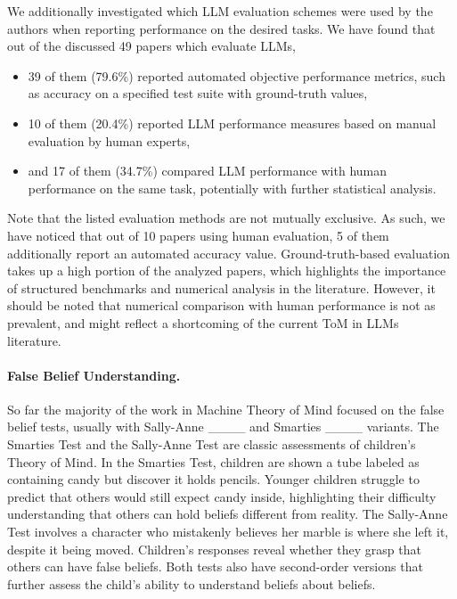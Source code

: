 We additionally investigated which LLM evaluation schemes were used by the authors when reporting performance on the desired tasks. We have found that out of the discussed 49 papers which evaluate LLMs,
\vspace{-0.5em}
\begin{itemize}
\itemsep-0.3em
    \item 39 of them (79.6\%) reported automated objective performance metrics, such as accuracy on a specified test suite with ground-truth values,
    \item 10 of them (20.4\%) reported LLM performance measures based on manual evaluation by human experts,
    \item and 17 of them (34.7\%) compared LLM performance with human performance on the same task, potentially with further statistical analysis.
\end{itemize}
Note that the listed evaluation methods are not mutually exclusive. As such, we have noticed that out of 10 papers using human evaluation, 5 of them additionally report an automated accuracy value. Ground-truth-based evaluation takes up a high portion of the analyzed papers, which highlights the importance of structured benchmarks and numerical analysis in the literature. However, it should be noted that numerical comparison with human performance is not as prevalent, and might reflect a shortcoming of the current ToM in LLMs literature.

\paragraph{False Belief Understanding.} So far the majority of the work in Machine Theory of Mind focused on the false belief tests, usually with Sally-Anne ____ and Smarties ____ variants. The Smarties Test and the Sally-Anne Test are classic assessments of children's Theory of Mind. In the Smarties Test, children are shown a tube labeled as containing candy but discover it holds pencils. Younger children struggle to predict that others would still expect candy inside, highlighting their difficulty understanding that others can hold beliefs different from reality. The Sally-Anne Test involves a character who mistakenly believes her marble is where she left it, despite it being moved. Children's responses reveal whether they grasp that others can have false beliefs. Both tests also have second-order versions that further assess the child's ability to understand beliefs about beliefs. 

